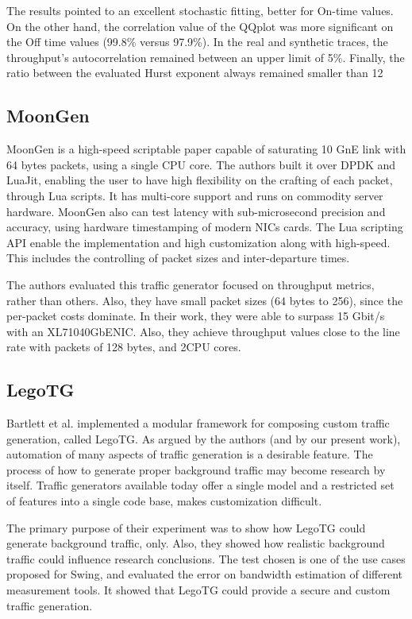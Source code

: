 The results pointed to an excellent stochastic fitting, better for On-time values. On the other hand, the correlation value of the QQplot was more significant on the Off time values (99.8\% versus 97.9\%). In the real and synthetic traces, the throughput's autocorrelation  remained between an upper limit of 5\%. Finally, the ratio between the evaluated Hurst exponent always remained smaller than 12%

\subsection{MoonGen}

MoonGen\cite{moongen-paper} is a high-speed scriptable paper capable of saturating 10 GnE link with 64 bytes packets, using a single CPU core. The authors built it over DPDK and LuaJit, enabling the user to have high flexibility on the crafting of each packet, through Lua scripts. It has multi-core support and runs on commodity server hardware. MoonGen also can test latency with sub-microsecond precision and accuracy, using hardware timestamping of modern NICs cards. The Lua scripting API enable the implementation and high customization along with high-speed. This includes the controlling of packet sizes and inter-departure times. 

The authors evaluated this traffic generator focused on throughput metrics, rather than others. Also, they have small packet sizes (64 bytes to 256), since the per-packet costs dominate. In their work, they were able to surpass 15 Gbit/s with an XL71040GbENIC. Also, they achieve throughput values close to the line rate with packets of 128 bytes, and 2CPU cores.

\subsection{LegoTG}

Bartlett et al.\cite{legotg-paper} implemented a modular framework for composing custom traffic generation, called LegoTG. As argued by the authors (and by our present work), automation of many aspects of traffic generation is a desirable feature. The process of how to generate proper background traffic may become research by itself. Traffic generators available today offer a single model and a restricted set of features into a single code base, makes customization difficult. 

The primary purpose of their experiment was to show how LegoTG could generate background traffic, only. Also, they showed how realistic background traffic could influence research conclusions. The test chosen is one of the use cases proposed for Swing\cite{background-traffic-matter}, and evaluated the error on bandwidth estimation of different measurement tools. It showed that LegoTG could provide a secure and custom traffic generation.


